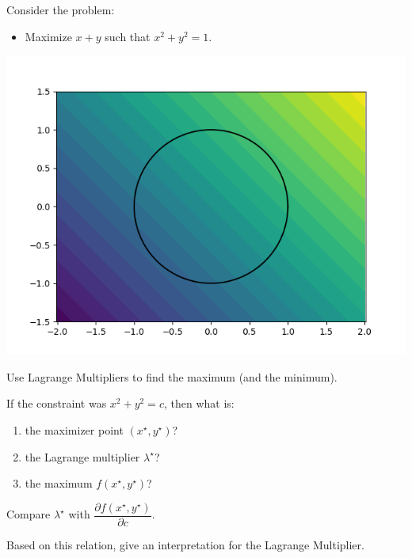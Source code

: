\documentclass{workbook}
\begin{document}
\begin{slide}
	
\begin{problem}[Example]
Consider the problem:
\begin{itemize}
	\item Maximize $x+y$ \quad such that $x^2+y^2 = 1$.
\end{itemize}
\end{problem}

\begin{center}
	\includegraphics[width=.4\textwidth]{images/LagrangeMultipliers-ex.png}
\end{center}

\begin{parts}
	\item Use Lagrange Multipliers to find the maximum (and the minimum).

	\item If the constraint was $x^2+y^2=c$, then what is:
	\begin{enumerate}
		\item the maximizer point $(x^\star,y^\star)$?
		\item the Lagrange multiplier $\lambda^\star$?
		\item the maximum $f(x^\star,y^\star)$?
	\end{enumerate}
	
	\item Compare $\lambda^\star$ with $\dfrac{\partial f(x^\star,y^\star)}{\partial c}$.
	
	\item Based on this relation, give an interpretation for the Lagrange Multiplier.
	
\end{parts}

\end{slide}
\end{document}
